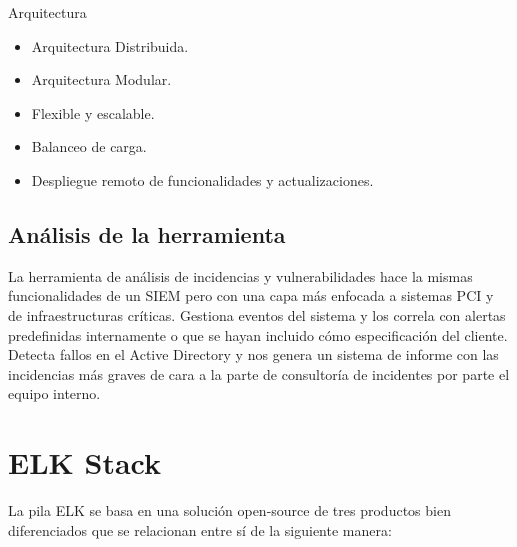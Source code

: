 Arquitectura
\begin{itemize}
\item Arquitectura Distribuida.
\item Arquitectura Modular.
\item Flexible y escalable.
\item Balanceo de carga.
\item Despliegue remoto de funcionalidades y actualizaciones.
\end{itemize}


\subsection{Análisis de la herramienta}

La herramienta de análisis de incidencias y vulnerabilidades hace la mismas funcionalidades de un SIEM pero con una capa más enfocada a sistemas PCI y de infraestructuras críticas. Gestiona eventos del sistema y los correla con alertas predefinidas internamente o que se hayan incluido cómo especificación del cliente. Detecta fallos en el Active Directory y nos genera un sistema de informe con las incidencias más graves de cara a la parte de consultoría de incidentes por parte el equipo interno.


\section{ELK Stack}

La pila ELK se basa en una solución open-source de tres productos bien diferenciados que se relacionan entre sí de la siguiente manera:

